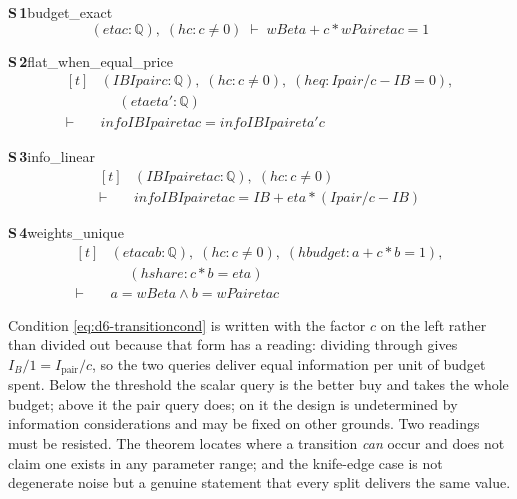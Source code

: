 \documentclass[conference]{IEEEtran}
\theoremstyle{definition}
\newcommand{\lean}[1]{\textsf{\footnotesize #1}}
\begin{document}
\noindent\textbf{S\,1}\quad\lean{budget\_exact}
{\footnotesize\[ (\mathit{eta} \mathit{c} : \mathbb{Q} ),\; (\mathit{hc} : \mathit{c} \neq 0) \;\vdash\; \mathit{wB} \mathit{eta} + \mathit{c} * \mathit{wPair} \mathit{eta} \mathit{c} = 1 \]}

\noindent\textbf{S\,2}\quad\lean{flat\_when\_equal\_price}
{\footnotesize\[ \begin{aligned}[t]
&(\mathit{IB} \mathit{Ipair} \mathit{c} : \mathbb{Q} ),\; (\mathit{hc} : \mathit{c} \neq 0),\; (\mathit{heq} : \mathit{Ipair} / \mathit{c} - \mathit{IB} = 0),\\
&\quad \; (\mathit{eta} \mathit{eta'} : \mathbb{Q} )\\
\vdash\;&\mathit{info} \mathit{IB} \mathit{Ipair} \mathit{eta} \mathit{c} = \mathit{info} \mathit{IB} \mathit{Ipair} \mathit{eta'} \mathit{c}
\end{aligned} \]}

\noindent\textbf{S\,3}\quad\lean{info\_linear}
{\footnotesize\[ \begin{aligned}[t]
&(\mathit{IB} \mathit{Ipair} \mathit{eta} \mathit{c} : \mathbb{Q} ),\; (\mathit{hc} : \mathit{c} \neq 0)\\
\vdash\;&\mathit{info} \mathit{IB} \mathit{Ipair} \mathit{eta} \mathit{c} = \mathit{IB} + \mathit{eta} * (\mathit{Ipair} / \mathit{c} - \mathit{IB})
\end{aligned} \]}

\noindent\textbf{S\,4}\quad\lean{weights\_unique}
{\footnotesize\[ \begin{aligned}[t]
&(\mathit{eta} \mathit{c} \mathit{a} \mathit{b} : \mathbb{Q} ),\; (\mathit{hc} : \mathit{c} \neq 0),\; (\mathit{hbudget} : \mathit{a} + \mathit{c} * \mathit{b} = 1),\\
&\quad \; (\mathit{hshare} : \mathit{c} * \mathit{b} = \mathit{eta})\\
\vdash\;&\mathit{a} = \mathit{wB} \mathit{eta} \wedge \mathit{b} = \mathit{wPair} \mathit{eta} \mathit{c}
\end{aligned} \]}


Condition \eqref{eq:d6-transitioncond} is written with the factor $c$ on the left rather than
divided out because that form has a reading: dividing through gives
$I_{B}/1=I_{\mathrm{pair}}/c$, so the two queries deliver equal information per unit of budget
spent. Below the threshold the scalar query is the better buy and takes the whole budget;
above it the pair query does; on it the design is undetermined by information considerations
and may be fixed on other grounds. Two readings must be resisted. The theorem locates where a
transition \emph{can} occur and does not claim one exists in any parameter range; and the
knife-edge case is not degenerate noise but a genuine statement that every split delivers the
same value.
\end{document}
